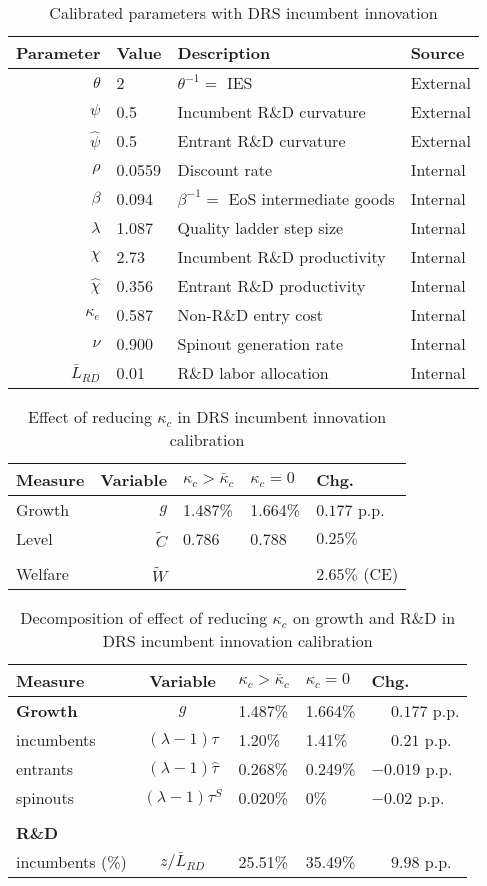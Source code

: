 \documentclass[ecta,nameyear,draft]{econsocart}
\theoremstyle{plain}
\theoremstyle{remark}
\begin{document}
\begin{appendix}
\begin{table}[]
	\centering
	\caption{Calibrated parameters with DRS incumbent innovation}\label{calibration_incumbentDRS_parameters}
	\begin{tabular}{rlll}
		\toprule \toprule
		Parameter & Value & Description & Source \tabularnewline
		\midrule
		$\theta$ & 2 & $\theta^{-1} = $ IES & External 
		\tabularnewline
		$\psi$ & 0.5 & Incumbent R\&D curvature & External \tabularnewline
		$\hat{\psi}$ & 0.5 & Entrant R\&D curvature & External \tabularnewline
		$\rho$ & 0.0559 & Discount rate  & Internal \tabularnewline
		$\beta$ & 0.094 & $\beta^{-1} = $ EoS intermediate goods & Internal \tabularnewline 
		$\lambda$ & 1.087 & Quality ladder step size & Internal 
		\tabularnewline
		$\chi$ & 2.73 & Incumbent R\&D productivity & Internal 
		\tabularnewline
		$\hat{\chi}$ & 0.356 & Entrant R\&D productivity & Internal \tabularnewline 
		$\kappa_e$ & 0.587 & Non-R\&D entry cost & Internal \tabularnewline
		$\nu$ & 0.900 & Spinout generation rate  & Internal\tabularnewline
		$\bar{L}_{RD}$ & 0.01 & R\&D labor allocation  & Internal \tabularnewline
		\bottomrule
	\end{tabular}
\end{table}

\begin{table}
	\centering
	\caption{Effect of reducing $\kappa_c$ in DRS incumbent innovation calibration}\label{reducing_kappa_c_table_incumbentRDS}
	\begin{tabular}{lrlll}
		\toprule \toprule
		Measure & Variable & $\kappa_c > \bar{\kappa}_c$ & $\kappa_c = 0$ & Chg. \tabularnewline
		\midrule
		Growth & $g$ & 1.487\% & 1.664\% & $0.177$ p.p. \tabularnewline
		Level & $\tilde{C}$  & 0.786 &  0.788 & $0.25\%$ \tabularnewline 
		\tabularnewline
		Welfare & $\tilde{W}$  &  & & $2.65\%$ (CE)  \tabularnewline
		\bottomrule
	\end{tabular}
\end{table}

\begin{table}[]
	\centering
	\caption{Decomposition of effect of reducing $\kappa_c$ on growth and R\&D in DRS incumbent innovation calibration}\label{reducing_kappa_c_decomposition_table_incumbentRDS}
	\begin{tabular}{lclll}
		\toprule \toprule
		Measure & Variable & $\kappa_c > \bar{\kappa}_c$ & $\kappa_c = 0$ & Chg. \tabularnewline
		\midrule
		\textbf{Growth} & $g$ & 1.487\% & 1.664\% & $\phantom{-}0.177$ p.p.\tabularnewline
		\multicolumn{1}{l}{\quad incumbents} & $(\lambda -1) \tau$  & 1.20\% & 1.41\% & $\phantom{-}0.21$ p.p. \tabularnewline
		\multicolumn{1}{l}{\quad entrants} & $(\lambda -1) \hat{\tau}$ & 0.268\% & 0.249\% & $-0.019$ p.p. \tabularnewline
		\multicolumn{1}{l}{\quad spinouts} & $(\lambda -1) \tau^S$ & 0.020\% & 0\% & $-0.02$ p.p. \tabularnewline
		\tabularnewline
		\textbf{R\&D} & & & & 
		\tabularnewline
		\multicolumn{1}{l}{\quad incumbents (\%)}  & $z / \bar{L}_{RD}$ & 25.51\% & 35.49\% & $\phantom{-} 9.98$ p.p. \tabularnewline 
		

\end{tabular}
\end{table}
\end{appendix}
\end{document}

